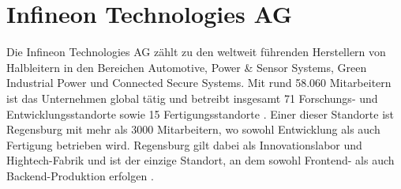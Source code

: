 \section{Infineon Technologies AG}

Die Infineon Technologies AG zählt zu den weltweit führenden Herstellern von Halbleitern in den Bereichen Automotive, Power \& Sensor Systems, Green Industrial Power und Connected Secure Systems. Mit rund 58.060 Mitarbeitern ist das Unternehmen global tätig und betreibt insgesamt 71 Forschungs- und Entwicklungsstandorte sowie 15 Fertigungsstandorte \cite{infineon2024unternehmenspraesentation}. Einer dieser Standorte ist Regensburg mit mehr als 3000 Mitarbeitern, wo sowohl Entwicklung als auch Fertigung betrieben wird. Regensburg gilt dabei als Innovationslabor und Hightech-Fabrik und ist der einzige Standort, an dem sowohl Frontend- als auch Backend-Produktion erfolgen \cite{infineon2024regensburg}.

